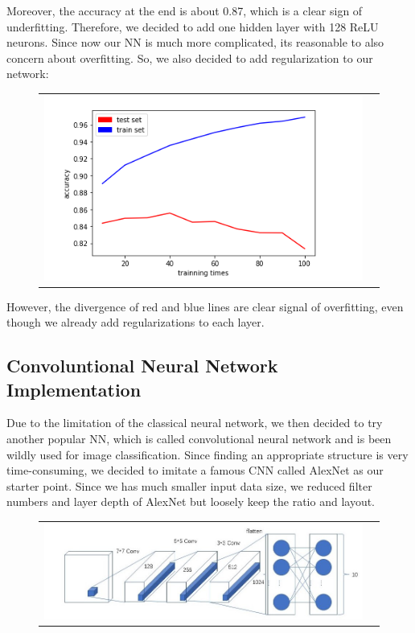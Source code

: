 \documentclass[12pt]{article}
\begin{document}
Moreover, the accuracy at the end is about 0.87, which is a clear sign of underfitting. Therefore, we decided to add one hidden layer with 128 ReLU neurons. Since now our NN is much more complicated, its reasonable to also concern about overfitting. So, we also decided to add regularization to our network:\\
\begin{figure}[H]
\begin{tabular}{cc}
  \includegraphics[width=\textwidth]{nn-4.png}
\end{tabular}
\end{figure}
However, the divergence of red and blue lines are clear signal of overfitting, even though we already add regularizations to each layer.
\subsection{Convoluntional Neural Network Implementation}
Due to the limitation of the classical neural network, we then decided to try another popular NN, which is called convolutional neural network and is been wildly used for image classification. Since finding an appropriate structure is very time-consuming, we decided to imitate a famous CNN called AlexNet as our starter point. Since we has much smaller input data size, we reduced filter numbers and layer depth of AlexNet but loosely keep the ratio and layout.
\begin{figure}[H]
\begin{tabular}{cc}
  \includegraphics[width=\textwidth]{cnn-1.jpg}
\end{tabular}
\end{figure}
\end{document}
